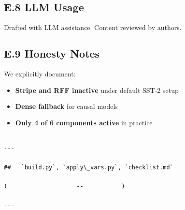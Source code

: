 \subsection{E.8 LLM Usage}

Drafted with LLM assistance. Content reviewed by authors.

\subsection{E.9 Honesty Notes}

We explicitly document:
\begin{itemize}
\item \textbf{Stripe and RFF inactive} under default SST-2 setup
\item \textbf{Dense fallback} for causal models
\item \textbf{Only 4 of 6 components active} in practice
\end{itemize}
\begin{lstlisting}

---

##   `build.py`, `apply\_vars.py`, `checklist.md`

(                    --           )

---
\end{lstlisting}

